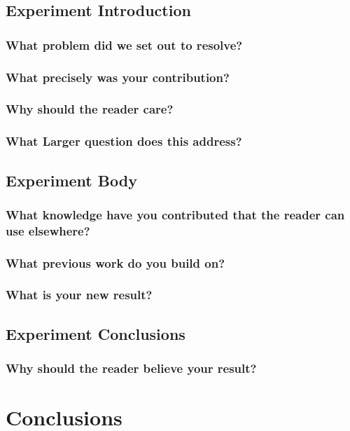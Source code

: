 \documentclass[journal]{IEEEtran}
\begin{document}
	\subsection{Experiment Introduction}
		\subsubsection{What problem did we set out to resolve?}
		\subsubsection{What precisely was your contribution?}
		\subsubsection{Why should the reader care?}
		\subsubsection{What Larger question does this address?}

		\subsection{Experiment Body}
		\subsubsection{What knowledge have you contributed that the reader can use elsewhere?}
		\subsubsection{What previous work do you build on?}
		\subsubsection{What is your new result?}

		\subsection{Experiment Conclusions}
		\subsubsection{Why should the reader believe your result?}


\section{Conclusions}
\end{document}
